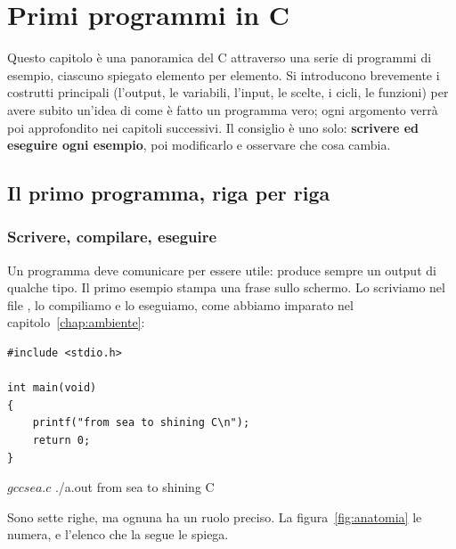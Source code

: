 \chapter{Primi programmi in C}
\label{chap:primi-programmi}

Questo capitolo è una panoramica del C attraverso una serie di programmi di
esempio, ciascuno spiegato elemento per elemento. Si introducono
brevemente i costrutti principali (l'output, le variabili, l'input, le
scelte, i cicli, le funzioni) per avere subito un'idea di come è fatto un
programma vero; ogni argomento verrà poi approfondito nei capitoli
successivi. Il consiglio è uno solo: \textbf{scrivere ed eseguire ogni
esempio}, poi modificarlo e osservare che cosa cambia.

\section{Il primo programma, riga per riga}

\subsection{Scrivere, compilare, eseguire}

Un programma deve comunicare per essere utile: produce sempre un output di
qualche tipo. Il primo esempio stampa una frase sullo schermo. Lo scriviamo
nel file , lo compiliamo e lo eseguiamo, come abbiamo imparato
nel capitolo~\ref{chap:ambiente}:

\begin{affianco}[0.5]
\begin{lstlisting}[style=c, name=sea.c]
#include <stdio.h>

int main(void)
{
    printf("from sea to shining C\n");
    return 0;
}
\end{lstlisting}
\risultato
\begin{console}
$ gcc sea.c
$ ./a.out
from sea to shining C
\end{console}
\end{affianco}

Sono sette righe, ma ognuna ha un ruolo preciso. La
figura~\ref{fig:anatomia} le numera, e l'elenco che la segue le spiega.

